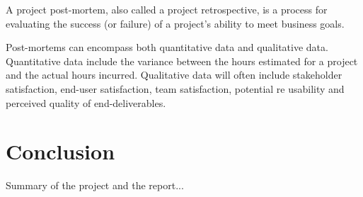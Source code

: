 A project post-mortem, also called a project retrospective, is a process for evaluating the success (or failure) of a project's ability to meet business goals. 

Post-mortems can encompass both quantitative data and qualitative data. Quantitative data include the variance between the hours estimated for a project and the actual hours incurred. Qualitative data will often include stakeholder satisfaction, end-user satisfaction, team satisfaction, potential re usability and perceived quality of end-deliverables.

\section{Conclusion}
Summary of the project and the report...